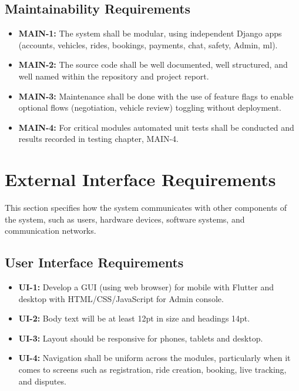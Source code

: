 \subsection{Maintainability Requirements}
\begin{itemize}
\item \textbf{MAIN-1:} The system shall be modular, using independent Django apps (accounts, vehicles, rides, bookings, payments, chat, safety, Admin, ml).
\item \textbf{MAIN-2:} The source code shall be well documented, well structured, and well named within the repository and project report.
\item \textbf{MAIN-3:} Maintenance shall be done with the use of feature flags to enable optional flows (negotiation, vehicle review) toggling without deployment.
\item \textbf{MAIN-4:} For critical modules automated unit tests shall be conducted and results recorded in testing chapter, MAIN-4.

\end{itemize}

\section{External Interface Requirements}

This section specifies how the system communicates with other components of the system, such as users, hardware devices, software systems, and communication networks.

\subsection{User Interface Requirements}
\begin{itemize}
\item \textbf{UI-1:} Develop a GUI (using web browser) for mobile with Flutter and desktop with HTML/CSS/JavaScript for Admin console.
\item \textbf{UI-2:} Body text will be at least 12pt in size and headings 14pt.
\item \textbf{UI-3:} Layout should be responsive for phones, tablets and desktop.
\item \textbf{UI-4:} Navigation shall be uniform across the modules, particularly when it comes to screens such as registration, ride creation, booking, live tracking, and disputes.
\end{itemize}


